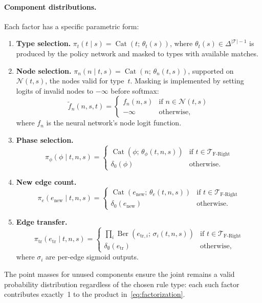 \documentclass[11pt,a4paper]{article}
\DeclareMathOperator{\Cat}{Cat}
\DeclareMathOperator{\Ber}{Ber}
\newcommand{\cT}{\mathcal{T}}
\newcommand{\cN}{\mathcal{N}}
\begin{document}
\paragraph{Component distributions.}
Each factor has a specific parametric form:
\begin{enumerate}
\item \textbf{Type selection.}
$\pi_t(t \mid s) = \Cat(t;\, \theta_t(s))$, where
$\theta_t(s) \in \Delta^{|\cT|-1}$ is produced by the policy network and
masked to types with available matches.

\item \textbf{Node selection.}
$\pi_n(n \mid t,s) = \Cat(n;\, \theta_n(t,s))$, supported on
$\cN(t,s)$, the nodes valid for type~$t$.  Masking is implemented by
setting logits of invalid nodes to $-\infty$ before softmax:
\[
\tilde{f}_n(n,s,t) = \begin{cases}
f_n(n,s) & \text{if } n \in \cN(t,s) \\
-\infty & \text{otherwise,}
\end{cases}
\]
where $f_n$ is the neural network's node logit function.

\item \textbf{Phase selection.}
\[
\pi_\phi(\phi \mid t,n,s) = \begin{cases}
\Cat(\phi;\, \theta_\phi(t,n,s)) & \text{if } t \in \cT_{\text{F-Right}} \\
\delta_0(\phi) & \text{otherwise.}
\end{cases}
\]

\item \textbf{New edge count.}
\[
\pi_e(e_{\mathrm{new}} \mid t,n,s) = \begin{cases}
\Cat(e_{\mathrm{new}};\, \theta_e(t,n,s)) & \text{if } t \in \cT_{\text{F-Right}} \\
\delta_0(e_{\mathrm{new}}) & \text{otherwise.}
\end{cases}
\]

\item \textbf{Edge transfer.}
\[
\pi_{\mathrm{tr}}(e_{\mathrm{tr}} \mid t,n,s) = \begin{cases}
\prod_{i} \Ber(e_{\mathrm{tr},i};\, \sigma_i(t,n,s)) & \text{if } t \in \cT_{\text{F-Right}} \\
\delta_\emptyset(e_{\mathrm{tr}}) & \text{otherwise,}
\end{cases}
\]
where $\sigma_i$ are per-edge sigmoid outputs.
\end{enumerate}

The point masses for unused components ensure the joint remains a valid
probability distribution regardless of the chosen rule type: each such
factor contributes exactly~1 to the product in~\cref{eq:factorization}.
\end{document}
